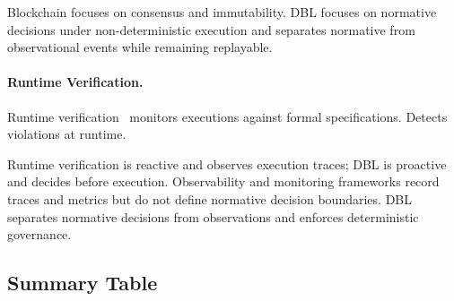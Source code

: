 Blockchain focuses on consensus and immutability. DBL focuses on normative decisions under non-deterministic execution and separates normative from observational events while remaining replayable.

\paragraph{Runtime Verification.}
Runtime verification~\cite{leucker2009brief} monitors executions against formal specifications. Detects violations at runtime.

Runtime verification is reactive and observes execution traces; DBL is proactive and decides before execution. Observability and monitoring frameworks record traces and metrics but do not define normative decision boundaries. DBL separates normative decisions from observations and enforces deterministic governance.

\subsection{Summary Table}

